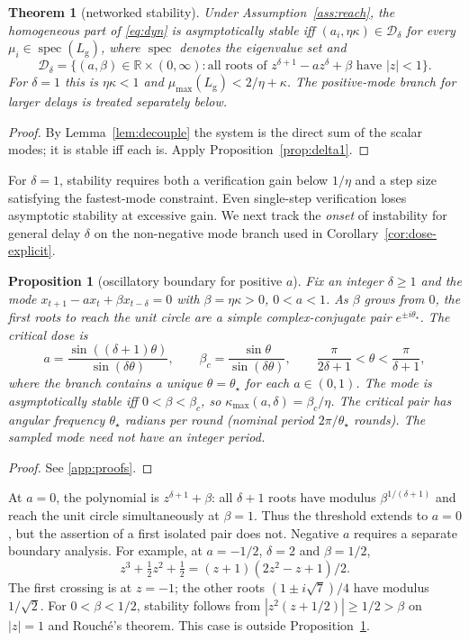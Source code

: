 \documentclass[11pt]{article}
\newtheorem{theorem}{Theorem}
\newtheorem{proposition}{Proposition}
\theoremstyle{definition}
\newcommand{\R}{\mathbb{R}}
\newcommand{\Lg}{L_{\mathrm g}}
\newcommand{\spec}{\operatorname{spec}}
\begin{document}
\begin{theorem}[networked stability]\label{thm:main}
Under Assumption~\ref{ass:reach}, the homogeneous part of \eqref{eq:dyn} is asymptotically stable iff
$(a_i,\eta\kappa)\in\mathcal D_\delta$ for every $\mu_i\in\spec(\Lg)$, where $\spec$ denotes the
eigenvalue set and
\[
 \mathcal D_\delta=\{(a,\beta)\in\R\times(0,\infty):
       \text{all roots of }z^{\delta+1}-az^\delta+\beta\text{ have }|z|<1\}.
\]
For $\delta=1$ this is
$\eta\kappa<1$ and $\mu_{\max}(\Lg)<2/\eta+\kappa$. The positive-mode branch for larger delays is treated separately below.
\end{theorem}
\begin{proof}
By Lemma~\ref{lem:decouple} the system is the direct sum of the scalar modes; it is stable iff each
is. Apply Proposition~\ref{prop:delta1}.
\end{proof}

For $\delta=1$, stability requires both a verification gain below $1/\eta$ and a step size satisfying
the fastest-mode constraint. Even single-step verification loses asymptotic stability at excessive
gain. We next track the \emph{onset} of instability for general delay $\delta$ on the non-negative
mode branch used in Corollary~\ref{cor:dose-explicit}.

\begin{proposition}[oscillatory boundary for positive $a$]\label{prop:boundary}
Fix an integer $\delta\ge1$ and the mode $x_{t+1}-a x_t+\beta x_{t-\delta}=0$ with $\beta=\eta\kappa>0$,
$0<a<1$. As $\beta$ grows from $0$, the first roots to reach the unit circle are a simple
complex-conjugate pair $e^{\pm i\theta_\star}$. The critical dose is
\begin{equation}\label{eq:boundary}
  a=\frac{\sin((\delta+1)\theta)}{\sin(\delta\theta)},\qquad
  \beta_c=\frac{\sin\theta}{\sin(\delta\theta)},\qquad
  \frac{\pi}{2\delta+1}<\theta<\frac{\pi}{\delta+1},
\end{equation}
where the branch contains a unique $\theta=\theta_\star$ for each $a\in(0,1)$.
The mode is asymptotically stable iff $0<\beta<\beta_c$, so
$\kappa_{\max}(a,\delta)=\beta_c/\eta$. The critical pair has angular frequency
$\theta_\star$ radians per round (nominal period $2\pi/\theta_\star$ rounds).
The sampled mode need not have an integer period.
\end{proposition}
\begin{proof}
See \ref{app:proofs}.
\end{proof}

At $a=0$, the polynomial is $z^{\delta+1}+\beta$: all $\delta+1$ roots have modulus
$\beta^{1/(\delta+1)}$ and reach the unit circle simultaneously at $\beta=1$. Thus the threshold
extends to $a=0$, but the assertion of a first isolated pair does not. Negative $a$ requires a separate
boundary analysis. For example, at $a=-1/2$, $\delta=2$ and $\beta=1/2$,
\[
  z^3+\tfrac12 z^2+\tfrac12=(z+1)(2z^2-z+1)/2.
\]
The first crossing is at $z=-1$; the other roots $(1\pm i\sqrt7)/4$ have modulus $1/\sqrt2$.
For $0<\beta<1/2$, stability follows from $|z^2(z+1/2)|\ge1/2>\beta$ on $|z|=1$
and Rouch\'e's theorem. This case is outside Proposition~\ref{prop:boundary}.
\end{document}
